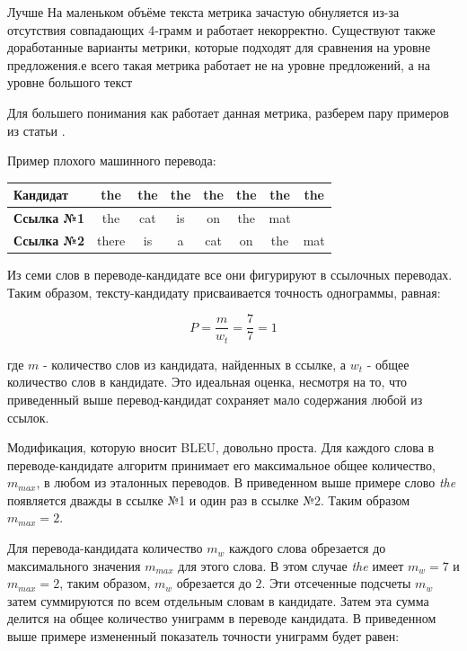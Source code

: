     Лучше На маленьком объёме текста метрика зачастую обнуляется из-за отсутствия совпадающих 4-грамм и работает некорректно. Существуют также доработанные варианты метрики, которые подходят для сравнения на уровне предложения.е всего такая метрика работает не на уровне предложений, а на уровне большого текст
    
    Для большего понимания как работает данная метрика, разберем пару примеров из статьи \cite{15}.
    
    Пример плохого машинного перевода:
    \begin{table}[h]
        \centering
        \begin{tabular}{|l|c|c|c|c|c|c|c|}
        \hline
        \textbf{Кандидат}  & the   & the & the & the & the & the & the \\ \hline
        \textbf{Ссылка №1} & the   & cat & is  & on  & the & mat &     \\ \hline
        \textbf{Ссылка №2} & there & is  & a   & cat & on  & the & mat \\ \hline
        \end{tabular}
    \end{table}
    
    Из семи слов в переводе-кандидате все они фигурируют в ссылочных переводах. Таким образом, тексту-кандидату присваивается точность однограммы, равная:
    
    $$
        P = \frac{m}{w_t} = \frac{7}{7} = 1
    $$
    
    где $m$ - количество слов из кандидата, найденных в ссылке, а $w_t$ - общее количество слов в кандидате. Это идеальная оценка, несмотря на то, что приведенный выше перевод-кандидат сохраняет мало содержания любой из ссылок.
    
    Модификация, которую вносит BLEU, довольно проста. Для каждого слова в переводе-кандидате алгоритм принимает его максимальное общее количество, $m_{max}$, в любом из эталонных переводов. В приведенном выше примере слово \textit{the} появляется дважды в ссылке №1 и один раз в ссылке №2. Таким образом $m_{max}=2$.
    
    Для перевода-кандидата количество $m_{w}$ каждого слова обрезается до максимального значения $m_{max}$ для этого слова. В этом случае \textit{the} имеет $m_{w}=7$ и $m_{max}=2$, таким образом, $m_{w}$ обрезается до $2$. Эти отсеченные подсчеты $m_{w}$ затем суммируются по всем отдельным словам в кандидате. Затем эта сумма делится на общее количество униграмм в переводе кандидата. В приведенном выше примере измененный показатель точности униграмм будет равен:
    
